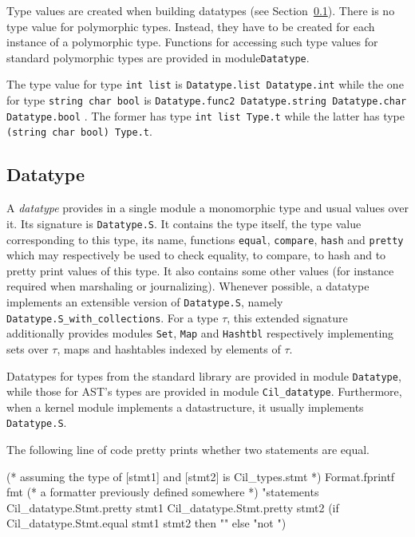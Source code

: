 Type values are created when building datatypes (see
Section~\ref{type:datatype}). There is no type value for polymorphic
types. Instead, they have to be created for each instance of a polymorphic
type. Functions for accessing such type values for standard \caml polymorphic
types are provided in module\texttt{Datatype}.
\begin{example}
The type value for type \texttt{int list} is \texttt{Datatype.list
  Datatype.int} while the one
for type \texttt{string \fl char \fl bool} is \texttt{Datatype.func2
  Datatype.string Datatype.char
  Datatype.bool}%
. The former has type
\texttt{int list Type.t} while the latter has type \texttt{(string \fl char \fl
  bool) Type.t}.
\end{example}

\subsection{Datatype}\label{type:datatype}

A \emph{datatype} provides in a single module a monomorphic type and usual
values over it. Its signature is \texttt{Datatype.S}. It
contains the type itself, the type value corresponding to this type, its name,
functions \texttt{equal}, \texttt{compare}, \texttt{hash} and \texttt{pretty}
which may respectively be used to check equality, to compare, to hash and to
pretty print values of this type. It also contains some other values (for
instance required when marshaling or journalizing). Whenever possible, a
datatype implements an extensible version of \texttt{Datatype.S}, namely
\texttt{Datatype.S\_with\_collections}.
For a type $\tau$, this extended signature additionally provides modules
\texttt{Set}, \texttt{Map} and \texttt{Hashtbl} respectively implementing sets
over $\tau$, maps and hashtables indexed by elements of $\tau$.

Datatypes for \caml types from the standard library are provided in module
\texttt{Datatype}, while those for AST's types are provided in
module \texttt{Cil\_datatype}. Furthermore, when a kernel
module implements a datastructure, it usually implements
\texttt{Datatype.S}.

\begin{example}
The following line of code pretty prints whether two statements are equal.
\begin{ocamlcode}
(* assuming the type of [stmt1] and [stmt2] is Cil_types.stmt *)
Format.fprintf 
  fmt (* a formatter previously defined somewhere *)
  "statements %
  Cil_datatype.Stmt.pretty stmt1 
  Cil_datatype.Stmt.pretty stmt2
  (if Cil_datatype.Stmt.equal stmt1 stmt2 then "" else "not ")
\end{ocamlcode}
\end{example}

